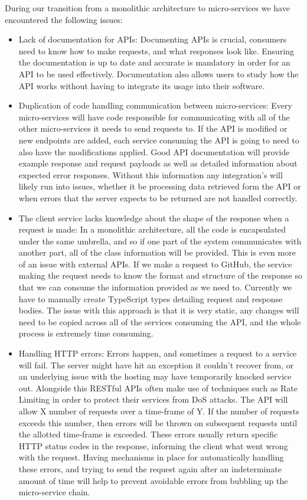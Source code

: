 During our transition from a monolithic architecture to micro-services we have encountered the following issues:
\begin{itemize}
  \item Lack of documentation for APIs: Documenting APIs is crucial, consumers need to know how to make requests, and what responses look like. Ensuring the documentation is up to date and accurate is mandatory in order for an API to be used effectively. Documentation also allows users to study how the API works without having to integrate its usage into their software. 
  \item Duplication of code handling communication between micro-services: Every micro-services will have code responsible for communicating with all of the other micro-services it needs to send requests to. If the API is modified or new endpoints are added, each service consuming the API is going to need to also have the modifications applied. Good API documentation will provide example response and request payloads as well as detailed information about expected error responses. Without this information any integration's will likely run into issues, whether it be processing data retrieved form the API or when errors that the server expects to be returned are not handled correctly. 
  \item The client service lacks knowledge about the shape of the response when a request is made: In a monolithic architecture, all the code is encapsulated under the same umbrella, and so if one part of the system communicates with another part, all of the class information will be provided. This is even more of an issue with external APIs. If we make a request to GitHub, the service making the request needs to know the format and structure of the response so that we can consume the information provided as we need to. Currently we have to manually create TypeScript types detailing request and response bodies. The issue with this approach is that it is very static, any changes will need to be copied across all of the services consuming the API, and the whole process is extremely time consuming.
  \item Handling HTTP errors: Errors happen, and sometimes a request to a service will fail. The server might have hit an exception it couldn't recover from, or an underlying issue with the hosting may have temporarily knocked service out. Alongside this RESTful APIs often make use of techniques such as Rate Limiting in order to protect their services from DoS attacks. The API will allow X number of requests over a time-frame of Y. If the number of requests exceeds this number, then errors will be thrown on subsequent requests until the allotted time-frame is exceeded. 
  These errors usually return specific HTTP status codes in the response, informing the client what went wrong with the request. Having mechanisms in place for automatically handling these errors, and trying to send the request again after an indeterminate amount of time will help to prevent avoidable errors from bubbling up the micro-service chain.
\end{itemize}
